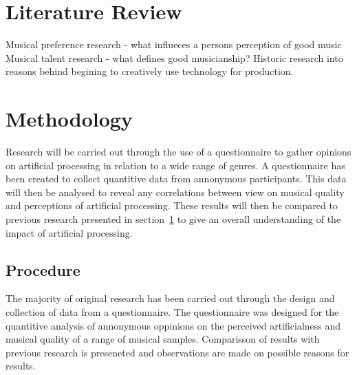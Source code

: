 \documentclass[titlepage]{scrartcl}
\begin{document}
    \section{Literature Review}\label{LR}
    Musical preference research - what influeces a persons perception of good
    music
    Musical talent research - what defines good musicianship?
    Historic research into reasons behind begining to creatively use technology for production.

    \section{Methodology}
    Research will be carried out through the use of a questionnaire to gather
    opinions on artificial processing in relation to a wide range of genres.
    A questionnaire has been created to collect quantitive data from annonymous
    participants. This data will then be analysed to reveal any correlations
    between view on musical quality and perceptions of artificial processing.
    These results will then be compared to previous research presented in
    section~\ref{LR} to give an overall understanding of the impact of
    artificial processing.

    \subsection{Procedure}
    The majority of original research has been carried out through the design and
    collection of data from a questionnaire. The questionnaire was designed for
    the quantitive analysis of annonymous oppinions on the perceived
    artificialness and musical quality of a range of musical samples.
    Comparisson of results with previous research is preseneted and
    observations are made on possible reasons for results.
\end{document}
